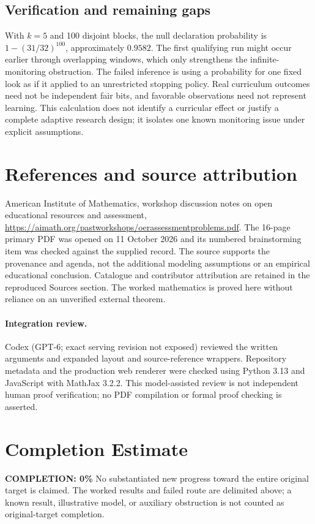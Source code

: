 \documentclass[11pt]{article}
\begin{document}
\subsection{Verification and remaining gaps}
With $k=5$ and 100 disjoint blocks, the null declaration probability is $1-(31/32)^{100}$, approximately $0.9582$. The first qualifying run might occur earlier through overlapping windows, which only strengthens the infinite-monitoring obstruction. The failed inference is using a probability for one fixed look as if it applied to an unrestricted stopping policy. Real curriculum outcomes need not be independent fair bits, and favorable observations need not represent learning. This calculation does not identify a curricular effect or justify a complete adaptive research design; it isolates one known monitoring issue under explicit assumptions.

\section{References and source attribution}
American Institute of Mathematics, workshop discussion notes on open educational resources and assessment, \url{https://aimath.org/pastworkshops/oerassessmentproblems.pdf}. The 16-page primary PDF was opened on 11 October 2026 and its numbered brainstorming item was checked against the supplied record. The source supports the provenance and agenda, not the additional modeling assumptions or an empirical educational conclusion. Catalogue and contributor attribution are retained in the reproduced Sources section. The worked mathematics is proved here without reliance on an unverified external theorem.


\paragraph{Integration review.} Codex (GPT-6; exact serving revision not exposed) reviewed the written arguments and expanded layout and source-reference wrappers. Repository metadata and the production web renderer were checked using Python 3.13 and JavaScript with MathJax 3.2.2. This model-assisted review is not independent human proof verification; no PDF compilation or formal proof checking is asserted.

\section{Completion Estimate}
\noindent\textbf{COMPLETION: 0\%}
No substantiated new progress toward the entire original target is claimed. The worked results and failed route are delimited above; a known result, illustrative model, or auxiliary obstruction is not counted as original-target completion.
\end{document}
